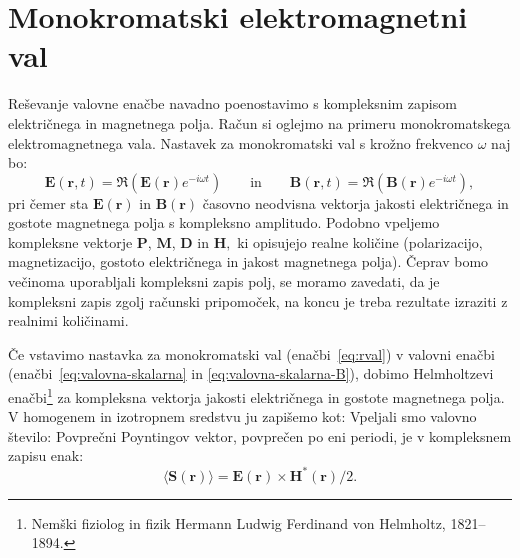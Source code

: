 \section{Monokromatski elektromagnetni val}
Reševanje valovne enačbe navadno poenostavimo s kompleksnim
zapisom električnega in magnetnega polja. Račun si
oglejmo na primeru monokromatskega elektromagnetnega vala. Nastavek
za monokromatski val s krožno frekvenco $\omega$ naj bo:
\begin{equation}
\mathbf{E}(\mathbf{r},t)  =\mathfrak{\Re}(\mathbf{E}(\mathbf{r})e^{-i\omega t})\qquad \textrm{in} \qquad
\mathbf{B}(\mathbf{r},t)  =\mathfrak{\Re}(\mathbf{B}(\mathbf{r})e^{-i\omega t}),
\label{eq:rval}
\end{equation}
pri čemer sta $\mathbf E(\mathbf{r})$ in $\mathbf B(\mathbf{r})$ časovno
neodvisna vektorja jakosti električnega in gostote
magnetnega polja s kompleksno
amplitudo. Podobno vpeljemo kompleksne vektorje $\mathbf{P}$,
$\mathbf{M}$, $\mathbf{D}$ in $\mathbf{H},$ ki opisujejo realne količine (polarizacijo,
magnetizacijo, gostoto električnega in jakost magnetnega polja).
Čeprav bomo večinoma uporabljali kompleksni zapis polj, se moramo zavedati, da
je kompleksni zapis zgolj računski pripomoček, na koncu
je treba rezultate izraziti z realnimi količinami. 

Če vstavimo nastavka za monokromatski val (enačbi~\ref{eq:rval}) v valovni enačbi
(enačbi~\ref{eq:valovna-skalarna} in \ref{eq:valovna-skalarna-B}), 
dobimo Helmholtzevi
enačbi\footnote{Nemški fiziolog in fizik Hermann Ludwig Ferdinand von Helmholtz, 1821--1894.} 
za kompleksna vektorja jakosti električnega in gostote magnetnega polja.
V homogenem in izotropnem sredstvu ju zapišemo kot:
Vpeljali smo valovno število:
Povprečni Poyntingov vektor, povprečen
po eni periodi, je v kompleksnem zapisu enak:
\begin{equation}
\langle\mathbf{S}(\mathbf{r})\rangle=\mathbf{E}(\mathbf{r})\times\mathbf{H}^{*}(\mathbf{r})/2.
\label{eq:Poyntingov-vektor-c}
\end{equation}

